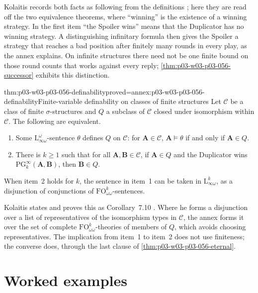 Kolaitis records both facts as following from the definitions
\cite[p.~56]{Kolaitis2003ExpressivePowerNotes}; here they are read off
the two equivalence theorems, where ``winning'' is the existence of a winning
strategy. In the first item ``the Spoiler wins'' means that the Duplicator
has no winning strategy. A distinguishing infinitary formula then gives the
Spoiler a strategy that reaches a bad position after finitely many rounds
in every play, as the annex explains. On infinite structures there need not
be one finite bound on those round counts that works against every reply;
\cref{thm:p03-w03-p03-056-successor} exhibits this distinction.

\begin{hbtheorem}{thm:p03-w03-p03-056-definability}{proved=annex:p03-w03-p03-056-definability}{Finite-variable definability on classes of finite structures}
Let \(\mathcal C\) be a class of finite \(\sigma\)-structures and \(Q\) a
subclass of \(\mathcal C\) closed under isomorphism within \(\mathcal C\).
The following are equivalent.
\begin{enumerate}
\item Some \(\mathrm{L}^\omega_{\infty\omega}\)-sentence \(\theta\) defines
      \(Q\) on \(\mathcal C\): for \(\mathbf A\in\mathcal C\),
      \(\mathbf A\models\theta\) if and only if \(\mathbf A\in Q\).
\item There is \(k\geq1\) such that for all \(\mathbf A,\mathbf B\in\mathcal C\),
      if \(\mathbf A\in Q\) and the Duplicator wins
      \(\mathrm{PG}^\infty_k(\mathbf A,\mathbf B)\), then \(\mathbf B\in Q\).
\end{enumerate}
When item~2 holds for \(k\), the sentence in item~1 can be taken in
\(\mathrm{L}^k_{\infty\omega}\), as a disjunction of conjunctions of
\(\mathrm{FO}^k_{\omega\omega}\)-sentences.
\end{hbtheorem}

Kolaitis states and proves this as Corollary~7.10
\cite[Cor.~7.10, p.~59]{Kolaitis2003ExpressivePowerNotes}. Where he
forms a disjunction over a list of representatives of the isomorphism types
in \(\mathcal C\), the annex forms it over the set of complete
\(\mathrm{FO}^k_{\omega\omega}\)-theories of members of \(Q\), which avoids
choosing representatives. The implication from item~1 to item~2 does not use
finiteness; the converse does, through the last clause of
\cref{thm:p03-w03-p03-056-eternal}.

\section{Worked examples}
\label{sec:p03-w03-p03-056-examples}

